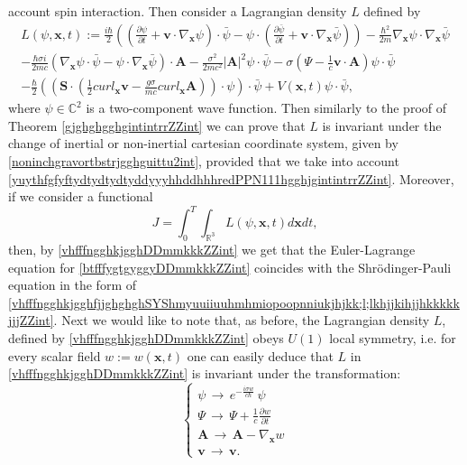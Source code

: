 \documentclass{article}
\theoremstyle{definition}
\theoremstyle{remark}
\renewcommand{\vec}[1]{\mathbf{#1}}
\newcommand{\er}{\eqref}
\newcommand{\er}{\eqref}
\begin{document}
account spin interaction. Then consider a Lagrangian density $L$
defined by
\begin{multline}\label{vhfffngghkjgghDDmmkkkZZint}
L\left(\psi,\vec x,t\right):=
\frac{i\hbar}{2}\left(\left(\frac{\partial\psi}{\partial t}+\vec
v\cdot\nabla_{\vec
x}\psi\right)\cdot\bar\psi-\psi\cdot\left(\frac{\partial\bar\psi}{\partial
t}+\vec v\cdot\nabla_{\vec
x}\bar\psi\right)\right)-\frac{\hbar^2}{2m}\nabla_{\vec
x}\psi\cdot\nabla_{\vec x}\bar\psi\\
-\frac{\hbar\sigma i}{2mc}\left(\nabla_{\vec
x}\psi\cdot\bar\psi-\psi\cdot\nabla_{\vec x}\bar\psi\right)\cdot\vec
A-\frac{\sigma^2}{2mc^2}\left|\vec A\right|^2\psi\cdot\bar\psi
-\sigma\left(\Psi-\frac{1}{c}\vec v\cdot\vec
A\right)\psi\cdot\bar\psi\\ -\frac{\hbar}{2}\left(\left(\vec
S\cdot\left(\frac{1}{2}curl_{\vec x}\vec
v-\frac{g\sigma}{mc}curl_{\vec x}\vec
A\right)\right)\cdot\psi\right)\cdot\bar\psi+V\left(\vec
x,t\right)\psi\cdot\bar\psi,
\end{multline}
where $\psi\in \mathbb{C}^2$ is a two-component wave function. Then
similarly to the proof of Theorem \ref{gjghghgghgintintrrZZint} we
can prove that $L$ is invariant under the change of inertial or
non-inertial cartesian coordinate system, given by
\er{noninchgravortbstrjgghguittu2int}, provided that we take into
account
\er{yuythfgfyftydtydtydtyddyyyhhddhhhredPPN111hgghjgintintrrZZint}.
Moreover, if we consider a functional
\begin{equation}\label{btfffygtgyggyDDmmkkkZZint}
J=\int_0^T\int_{\mathbb{R}^3}L\left(\psi,\vec x,t\right)d\vec x dt,
\end{equation}
then, by \er{vhfffngghkjgghDDmmkkkZZint} we get that the
Euler-Lagrange equation for \er{btfffygtgyggyDDmmkkkZZint} coincides
with the Shr\"{o}dinger-Pauli equation in the form of
\er{vhfffngghkjgghfjjghghghSYShmyuuiiuuhmhmiopoopnniukjhjkk;l;lkhjjkihjjhkkkkkjjjZZint}.
Next we would like to note that, as before, the Lagrangian density
$L$, defined by \er{vhfffngghkjgghDDmmkkkZZint} obeys $U(1)$ local
symmetry, i.e. for every scalar field $w:=w(\vec x,t)$ one can
easily deduce that $L$ in \er{vhfffngghkjgghDDmmkkkZZint} is
invariant under the transformation:
\begin{equation}\label{MaxVacFull1bjkgjhjhgjgjgkjfhjfdghghligioiuittrPPNhjkjhkjgghhjjhjintiiihhintsp}
\begin{cases}
\psi\,\to\,e^{-\frac{i\sigma w}{c\hbar}}\,\psi
\\
\Psi\,\to\,\Psi+\frac{1}{c}\frac{\partial w}{\partial t}\\
\vec A\,\to\,\vec A-\nabla_{\vec x}w\\
\vec v\,\to\,\vec v.
\end{cases}
\end{equation}
\end{document}
